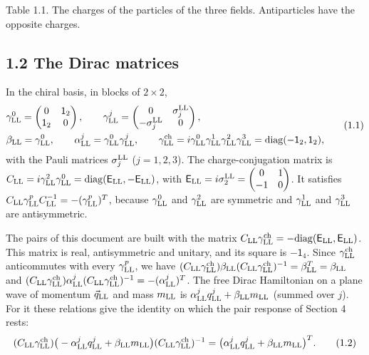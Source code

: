 \documentclass[
  10pt,
]{article}
\begin{document}
Table 1.1. The charges of the particles of the three fields.
Antiparticles have the opposite charges.

\hypertarget{the-dirac-matrices}{%
\subsection{1.2 The Dirac matrices}\label{the-dirac-matrices}}

In the chiral basis, in blocks of \(2\times2\),
\[\begin{aligned}&\gamma^0_{\rm LL}=\begin{pmatrix}0&\mathsf 1_2\\\mathsf 1_2&0\end{pmatrix},\qquad\gamma^j_{\rm LL}=\begin{pmatrix}0&\sigma^{\rm LL}_j\\-\sigma^{\rm LL}_j&0\end{pmatrix},\\
&\beta_{\rm LL}=\gamma^0_{\rm LL},\qquad\alpha^j_{\rm LL}=\gamma^0_{\rm LL}\gamma^j_{\rm LL},\qquad\gamma^{\rm ch}_{\rm LL}=i\gamma^0_{\rm LL}\gamma^1_{\rm LL}\gamma^2_{\rm LL}\gamma^3_{\rm LL}=\mathrm{diag}(-\mathsf 1_2,\mathsf 1_2),\end{aligned}\tag{1.1}\]
with the Pauli matrices \(\sigma^{\rm LL}_j\) (\(j=1,2,3\)). The
charge-conjugation matrix is
\(C_{\rm LL}=i\gamma^2_{\rm LL}\gamma^0_{\rm LL}=\mathrm{diag}(\mathsf E_{\rm LL},-\mathsf E_{\rm LL})\),
with
\(\mathsf E_{\rm LL}=i\sigma^{\rm LL}_2=\begin{pmatrix}0&1\\-1&0\end{pmatrix}\).
It satisfies
\(C_{\rm LL}\gamma^p_{\rm LL}C_{\rm LL}^{-1}=-(\gamma^p_{\rm LL})^T\),
because \(\gamma^0_{\rm LL}\) and \(\gamma^2_{\rm LL}\) are symmetric
and \(\gamma^1_{\rm LL}\) and \(\gamma^3_{\rm LL}\) are antisymmetric.

The pairs of this document are built with the matrix
\(C_{\rm LL}\gamma^{\rm ch}_{\rm LL}=-\mathrm{diag}(\mathsf E_{\rm LL},\mathsf E_{\rm LL})\).
This matrix is real, antisymmetric and unitary, and its square is
\(-\mathsf 1_4\). Since \(\gamma^{\rm ch}_{\rm LL}\) anticommutes with
every \(\gamma^p_{\rm LL}\), we have
\((C_{\rm LL}\gamma^{\rm ch}_{\rm LL})\beta_{\rm LL}(C_{\rm LL}\gamma^{\rm ch}_{\rm LL})^{-1}=\beta_{\rm LL}^T=\beta_{\rm LL}\)
and
\((C_{\rm LL}\gamma^{\rm ch}_{\rm LL})\alpha^j_{\rm LL}(C_{\rm LL}\gamma^{\rm ch}_{\rm LL})^{-1}=-(\alpha^j_{\rm LL})^T\).
The free Dirac Hamiltonian on a plane wave of momentum
\(\vec q_{\rm LL}\) and mass \(m_{\rm LL}\) is
\(\alpha^j_{\rm LL}q^j_{\rm LL}+\beta_{\rm LL}m_{\rm LL}\) (summed over
\(j\)). For it these relations give the identity on which the pair
response of Section 4 rests:
\[(C_{\rm LL}\gamma^{\rm ch}_{\rm LL})\big(-\alpha^j_{\rm LL}q^j_{\rm LL}+\beta_{\rm LL}m_{\rm LL}\big)(C_{\rm LL}\gamma^{\rm ch}_{\rm LL})^{-1}=\big(\alpha^j_{\rm LL}q^j_{\rm LL}+\beta_{\rm LL}m_{\rm LL}\big)^T.\tag{1.2}\]
\end{document}
